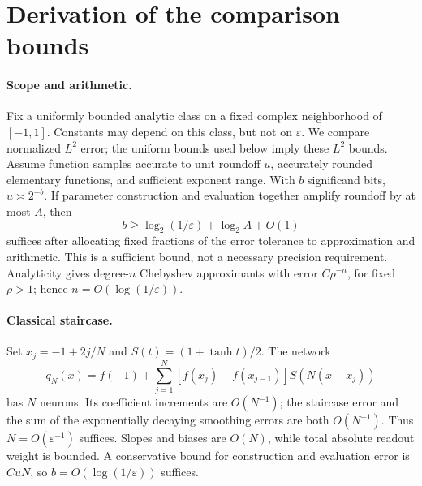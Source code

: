 \section{Derivation of the comparison bounds}
\label{app:comparison-bounds}

\paragraph{Scope and arithmetic.}
Fix a uniformly bounded analytic class on a fixed complex neighborhood of
$[-1,1]$. Constants may depend on this class, but not on $\varepsilon$.
We compare normalized $L^2$ error; the uniform bounds used below imply these
$L^2$ bounds. Assume function samples accurate to unit roundoff $u$, accurately
rounded elementary functions, and sufficient exponent range. With $b$
significand bits, $u\asymp 2^{-b}$. If parameter construction and evaluation
together amplify roundoff by at most $A$, then
\begin{equation}
  b \ge \log_2(1/\varepsilon)+\log_2 A+O(1)
  \label{eq:comparison-bits}
\end{equation}
suffices after allocating fixed fractions of the error tolerance to
approximation and arithmetic. This is a sufficient bound, not a necessary
precision requirement. Analyticity gives degree-$n$ Chebyshev approximants
with error $C\rho^{-n}$, for fixed $\rho>1$; hence
$n=O(\log(1/\varepsilon))$.

\paragraph{Classical staircase.}
Set $x_j=-1+2j/N$ and $S(t)=(1+\tanh t)/2$. The network
\begin{equation}
 q_N(x)=f(-1)+\sum_{j=1}^{N}
 [f(x_j)-f(x_{j-1})]S\!\left(N(x-x_j)\right)
\end{equation}
has $N$ neurons. Its coefficient increments are $O(N^{-1})$; the staircase
error and the sum of the exponentially decaying smoothing errors are both
$O(N^{-1})$. Thus $N=O(\varepsilon^{-1})$ suffices. Slopes and biases are
$O(N)$, while total absolute readout weight is bounded. A conservative bound
for construction and evaluation error is $CuN$, so
$b=O(\log(1/\varepsilon))$ suffices.

